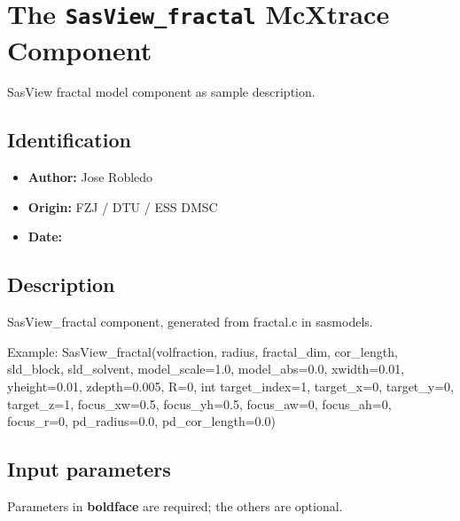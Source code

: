 \section{The \texttt{SasView\_fractal} McXtrace Component}
SasView fractal model component as sample description.

\subsection*{Identification}
\begin{itemize}
  \item \textbf{Author:} Jose Robledo
  \item \textbf{Origin:} FZJ / DTU / ESS DMSC
  \item \textbf{Date:} 
\end{itemize}

\subsection*{Description}
SasView\_fractal component, generated from fractal.c in sasmodels.

Example: SasView\_fractal(volfraction, radius, fractal\_dim, cor\_length, sld\_block, sld\_solvent, model\_scale=1.0, model\_abs=0.0, xwidth=0.01, yheight=0.01, zdepth=0.005, R=0, int target\_index=1, target\_x=0, target\_y=0, target\_z=1, focus\_xw=0.5, focus\_yh=0.5, focus\_aw=0, focus\_ah=0, focus\_r=0, pd\_radius=0.0, pd\_cor\_length=0.0)

\subsection*{Input parameters}
Parameters in \textbf{boldface} are required; the others are optional.

